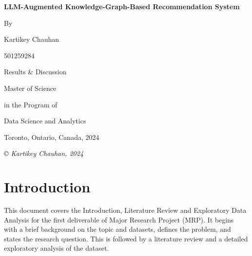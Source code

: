 \documentclass{article}
\begin{document}
\begin{titlepage}
      \centering
      {\LARGE\bfseries LLM-Augmented Knowledge-Graph-Based Recommendation
            System}

      \vspace{1.5cm}

      {\Large By}

      {\Large Kartikey Chauhan

            501259284 }

      \vspace{2cm}
      {\Large Results \& Discussion
      }

      \vspace{2cm}

      {\Large Master of Science

            in the Program of

            Data Science and Analytics

      }

      \vspace{2cm}
      {\Large Toronto, Ontario, Canada, 2024}

      \vfill

      {\itshape © Kartikey Chauhan, 2024}
\end{titlepage}

\setcounter{page}{2}

\tableofcontents
\listoffigures
\listoftables

\fancyhf{}
\renewcommand{\headrulewidth}{0pt}
\fancyfoot[R]{\thepage}
\renewcommand{\footrulewidth}{0pt}

\section{Introduction}

This document covers the Introduction, Literature Review and Exploratory Data
Analysis for the first deliverable of Major Research Project (MRP). It begins
with a brief background on the topic and datasets, defines the problem, and
states the research question. This is followed by a literature review and a
detailed exploratory analysis of the dataset.
\end{document}
